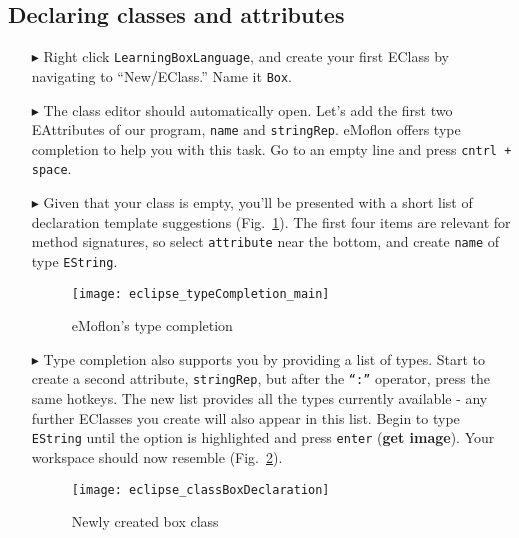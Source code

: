 \newpage
\subsection{Declaring classes and attributes}
\texHeader
\hypertarget{static:classes tex}{}

\begin{itemize}

\item[$\blacktriangleright$] Right click \texttt{LearningBoxLanguage}, and create your first EClass by navigating to ``New/EClass.'' Name it \texttt{Box}.

\item[$\blacktriangleright$] The class editor should automatically open. Let's add the first two EAttributes of our program, \texttt{name} and
\texttt{stringRep}. eMoflon offers type completion to help you with this task. Go to an empty line and press \texttt{cntrl + space}.

\item[$\blacktriangleright$] Given that your class is empty, you'll be presented with a short list of declaration template suggestions
(Fig.~\ref{fig:typeComp_Main}). The first four items are relevant for method signatures, so select \texttt{attribute} near the bottom, and create \texttt{name}
of type \texttt{EString}.

\begin{figure}[htbp]
	\centering
  \texttt{[image: eclipse\_typeCompletion\_main]}
	\caption{eMoflon's type completion}
	\label{fig:typeComp_Main}
\end{figure} 

\item[$\blacktriangleright$] Type completion also supports you by providing a list of types. Start to create a second attribute, \texttt{stringRep}, but after
the \texttt{``:''} operator, press the same hotkeys. The new list provides all the types currently available - any further EClasses you create will also appear
in this list. Begin to type \texttt{EString} until the option is highlighted and press \texttt{enter} ({\bf get image}). Your workspace should now resemble
(Fig.~\ref{fig:boxDeclaration}).

\begin{figure}[h!]
	\centering
  \texttt{[image: eclipse\_classBoxDeclaration]}
	\caption{Newly created box class}
	\label{fig:boxDeclaration}
\end{figure} 
\FloatBarrier

\newpage


\end{itemize}
